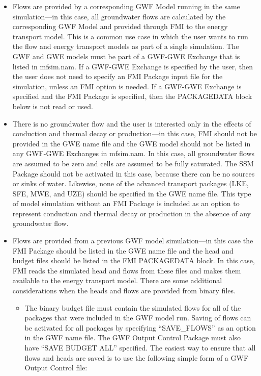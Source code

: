 \begin{itemize}

\item Flows are provided by a corresponding GWF Model running in the same simulation---in this case, all groundwater flows are calculated by the corresponding GWF Model and provided through FMI to the energy transport model.  This is a common use case in which the user wants to run the flow and energy transport models as part of a single simulation.  The GWF and GWE models must be part of a GWF-GWE Exchange that is listed in mfsim.nam.  If a GWF-GWE Exchange is specified by the user, then the user does not need to specify an FMI Package input file for the simulation, unless an FMI option is needed.  If a GWF-GWE Exchange is specified and the FMI Package is specified, then the PACKAGEDATA block below is not read or used.

\item There is no groundwater flow and the user is interested only in the effects of conduction and thermal decay or production---in this case, FMI should not be provided in the GWE name file and the GWE model should not be listed in any GWF-GWE Exchanges in mfsim.nam.  In this case, all groundwater flows are assumed to be zero and cells are assumed to be fully saturated.  The SSM Package should not be activated in this case, because there can be no sources or sinks of water.  Likewise, none of the advanced transport packages (LKE, SFE, MWE, and UZE) should be specified in the GWE name file.  This type of model simulation without an FMI Package is included as an option to represent conduction and thermal decay or production in the absence of any groundwater flow.

\item Flows are provided from a previous GWF model simulation---in this case the FMI Package should be listed in the GWE name file and the head and budget files should be listed in the FMI PACKAGEDATA block.  In this case, FMI reads the simulated head and flows from these files and makes them available to the energy transport model.  There are some additional considerations when the heads and flows are provided from binary files.

\begin{itemize}
\item The binary budget file must contain the simulated flows for all of the packages that were included in the GWF model run.  Saving of flows can be activated for all packages by specifying ``SAVE\_FLOWS'' as an option in the GWF name file.  The GWF Output Control Package must also have ``SAVE BUDGET ALL'' specified.  The easiest way to ensure that all flows and heads are saved is to use the following simple form of a GWF Output Control file:


\end{itemize}
\end{itemize}
